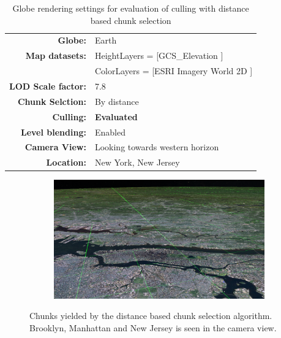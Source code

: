 \begin{table}[h]
  \centering
  \caption[]{Globe rendering settings for evaluation of culling with distance based chunk selection}
  \label{table:cullingdsettings}
  \begin{tabular}{| r l |}
    \hline
      \textbf{Globe:}             & Earth \\
      \textbf{Map datasets:}      & HeightLayers = [GCS\_Elevation \cite{worldelevation3d}] \\
                                  & ColorLayers = [ESRI Imagery World 2D \cite{imageryworld2d}] \\
      \textbf{LOD Scale factor:}  & 7.8 \\
      \textbf{Chunk Selction:}    & By distance \\
      \textbf{Culling:}           & \textbf{Evaluated} \\
      \textbf{Level blending:}    & Enabled \\
      \textbf{Camera View:}       & Looking towards western horizon\\
      \textbf{Location:}          & New York, New Jersey\\
    \hline
  \end{tabular}
\end{table}

\begin{figure}[h]
    \centering
    \begin{subfigure}[bt]{1.0\textwidth}
        \includegraphics[width=\textwidth]{figures/results/culling/cam_d.png}
    \end{subfigure}
    \caption{Chunks yielded by the distance based chunk selection algorithm. Brooklyn, Manhattan and New Jersey is seen in the camera view.}
    \label{fig:cullingdcam}
\end{figure}

